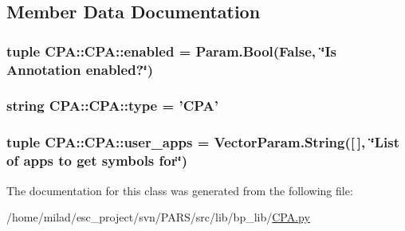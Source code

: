 \subsection{Member Data Documentation}
\hypertarget{classCPA_1_1CPA_aa51fc369b2c6374a7e8528ebcefebad8}{
\subsubsection[{enabled}]{\setlength{\rightskip}{0pt plus 5cm}tuple {\bf CPA::CPA::enabled} = {\bf Param.Bool}(False, \char`\"{}Is Annotation {\bf enabled}?\char`\"{})}}
\label{classCPA_1_1CPA_aa51fc369b2c6374a7e8528ebcefebad8}
\hypertarget{classCPA_1_1CPA_acdfeaa8a4e65e395f0625cbb0003d6d9}{
\subsubsection[{type}]{\setlength{\rightskip}{0pt plus 5cm}string {\bf CPA::CPA::type} = '{\bf CPA}'}}
\label{classCPA_1_1CPA_acdfeaa8a4e65e395f0625cbb0003d6d9}
\hypertarget{classCPA_1_1CPA_a81ba328a54b3af6462493b928a9656f5}{
\subsubsection[{user\_\-apps}]{\setlength{\rightskip}{0pt plus 5cm}tuple {\bf CPA::CPA::user\_\-apps} = VectorParam.String(\mbox{[}$\,$\mbox{]}, \char`\"{}List of apps to get symbols for\char`\"{})}}
\label{classCPA_1_1CPA_a81ba328a54b3af6462493b928a9656f5}


The documentation for this class was generated from the following file:\begin{DoxyCompactItemize}
\item 
/home/milad/esc\_\-project/svn/PARS/src/lib/bp\_\-lib/\hyperlink{CPA_8py}{CPA.py}\end{DoxyCompactItemize}
